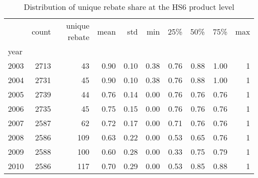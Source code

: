 \documentclass[preview]{standalone}
\begin{document}
\begin{table}[!htbp] \centering
\caption{Distribution of unique rebate share at the HS6 product level}

\begin{adjustbox}{width=\textwidth, totalheight=\baselineskip,keepaspectratio}
\begin{tabular}{lrrrrrrrrr}
\toprule
{} &  count &  unique rebate &  mean &   std &   min &   25\% &   50\% &   75\% &  max \\
year &        &                &       &       &       &       &       &       &      \\
\midrule
2003 &   2713 &             43 &  0.90 &  0.10 &  0.38 &  0.76 &  0.88 &  1.00 &    1 \\
2004 &   2731 &             45 &  0.90 &  0.10 &  0.38 &  0.76 &  0.88 &  1.00 &    1 \\
2005 &   2739 &             44 &  0.76 &  0.14 &  0.00 &  0.76 &  0.76 &  0.76 &    1 \\
2006 &   2735 &             45 &  0.75 &  0.15 &  0.00 &  0.76 &  0.76 &  0.76 &    1 \\
2007 &   2587 &             62 &  0.72 &  0.17 &  0.00 &  0.71 &  0.76 &  0.76 &    1 \\
2008 &   2586 &            109 &  0.63 &  0.22 &  0.00 &  0.53 &  0.65 &  0.76 &    1 \\
2009 &   2588 &            100 &  0.60 &  0.28 &  0.00 &  0.33 &  0.75 &  0.79 &    1 \\
2010 &   2586 &            117 &  0.70 &  0.29 &  0.00 &  0.53 &  0.85 &  0.88 &    1 \\
\bottomrule
\end{tabular}

\end{adjustbox}

\begin{tablenotes}
\small
\item


\end{tablenotes}
\end{table}
\end{document}
